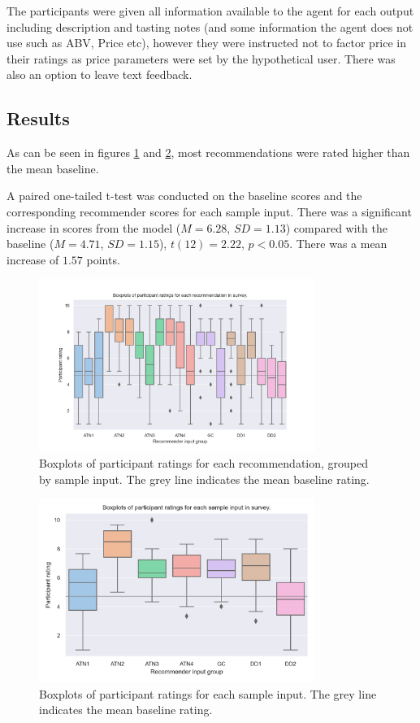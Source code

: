 The participants were given all information available to the 
agent for each output including description and tasting notes (and some information the agent does not use such as 
ABV, Price etc), however they were instructed not to factor price in their ratings as price parameters were set 
by the hypothetical user. There was also an option to leave text feedback.

\subsection{Results}\label{sec:res}

As can be seen in figures \ref{fig:allrec} and \ref{fig:avgrec}, most recommendations were rated higher than 
the mean baseline. 

A paired one-tailed t-test was conducted on the baseline scores and the corresponding recommender scores for
each sample input. There was a significant increase in scores from the model ($M=6.28$, $SD=1.13$)
compared with the baseline ($M=4.71$, $SD=1.15$), $t(12) = 2.22$, $p<0.05$. There was a mean increase of $1.57$ 
points.

\begin{figure}[!htb]
    \centering
    \includegraphics[width=0.8\textwidth]{graphics/all_recommendations}
    \caption{Boxplots of participant ratings for each recommendation, grouped by sample input. The grey line 
    indicates the mean baseline rating.}\label{fig:allrec}
\end{figure}

\begin{figure}[!htb]
    \centering
    \includegraphics[width=0.8\textwidth]{graphics/avg_recommendations}
    \caption{Boxplots of participant ratings for each sample input. The grey line 
    indicates the mean baseline rating.}\label{fig:avgrec}
\end{figure}

